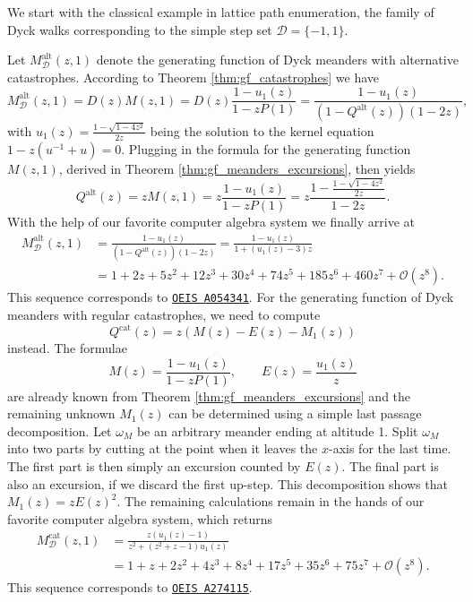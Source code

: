 We start with the classical example in lattice path enumeration, the family of Dyck walks corresponding to the simple step set $\mathcal{D} = \{-1,1\}$.

\begin{example}
  \label{ex:dyck_meanders_alt_cats}
  Let $M_\mathcal{D}^\mathrm{alt}(z,1)$ denote the generating function of Dyck meanders with alternative catastrophes.
  According to Theorem \ref{thm:gf_catastrophes} we have 
  \begin{equation*} 
    M_\mathcal{D}^\mathrm{alt}(z,1) = D(z)M(z,1) = D(z) \frac{1 - u_1(z)}{1 - zP(1)}
    = \frac{1 - u_1(z)}{(1 - Q^\mathrm{alt}(z))(1 - 2z)}, 
  \end{equation*}
  with $u_1(z) = \frac{1 - \sqrt{1 - 4z^2}}{2z}$ being the solution to the kernel equation $1 - z(u^{-1} + u) = 0$.
  Plugging in the formula for the generating function $M(z,1)$, derived in Theorem \ref{thm:gf_meanders_excursions}, then yields
  $$ 
    Q^\mathrm{alt}(z) = zM(z,1) = z\frac{1 - u_1(z)}{1 - zP(1)} = z\frac{1 - \frac{1 - \sqrt{1 - 4z^{2}}}{2z}}{1-2z}. 
  $$
  With the help of our favorite computer algebra system we finally arrive at
  \begin{align*} 
    M_\mathcal{D}^\mathrm{alt}(z,1) &= \frac{1 - u_1(z)}{(1-Q^\mathrm{alt}(z))(1-2z)} 
    = \frac{1 - u_{1}(z)}{1 + (u_{1}(z) - 3)z} \\
    &= 1 + 2z + 5z^{2} + 12z^{3} + 30z^{4} + 74z^{5} + 185z^{6} + 460z^{7} + \mathcal{O}(z^{8}). 
  \end{align*}
  This sequence corresponds to \href{https://oeis.org/A054341}{\texttt{OEIS A054341}}.
  For the generating function of Dyck meanders with regular catastrophes,
  we need to compute 
  $$
    Q^\mathrm{cat}(z) = z(M(z) - E(z) - M_1(z))
  $$
  instead. The formulae
  $$
    M(z) = \frac{1 - u_1(z)}{1 - zP(1)}, \qquad E(z) = \frac{u_1(z)}{z}
  $$
  are already known from Theorem \ref{thm:gf_meanders_excursions} and the remaining unknown $M_1(z)$ can be determined using a simple last passage decomposition.
  Let $\omega_M$ be an arbitrary meander ending at altitude 1. Split $\omega_M$ into two parts by cutting at the point when it leaves the $x$-axis for the last time. The first part is then simply an excursion counted by $E(z)$. The final part is also an excursion, if we discard the first up-step. This decomposition shows that $M_1(z) = zE(z)^2$. The remaining calculations remain in the hands of our favorite computer algebra system, which returns
  \begin{align*}
    M_\mathcal{D}^\mathrm{cat}(z,1) &= \frac{z(u_1(z) - 1)}{z^2 + (z^2 + z - 1)u_1(z)} \\
    &= 1 + z + 2z^2 + 4z^3 + 8z^4 + 17z^5 + 35z^6 + 75z^7 + \mathcal{O}(z^8).
  \end{align*}
  This sequence corresponds to \href{https://oeis.org/A274115}{\texttt{OEIS A274115}}.
\end{example}

